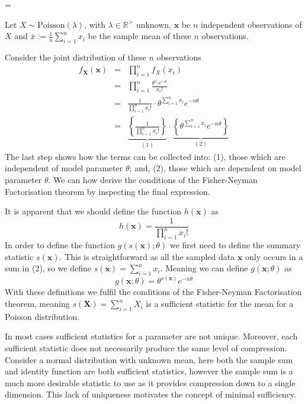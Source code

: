 \documentclass[11pt,a4paper]{article}
\theoremstyle{break}
\begin{document}
  \begin{box_example}\label{example_sufficient_stats_poisson}
    \everymath={\displaystyle}
    \par\par Let $X\sim\text{Poisson}(\lambda)$, with $\lambda\in\mathbb{R}^{>}$ unknown, $\mathbf{x}$ be $n$ independent observations of $X$ and $\textstyle\bar{x}:=\frac1n\sum_{i=1}^nx_i$ be the sample mean of these $n$ observations.
    \par Consider the joint distribution of these $n$ observations
    \[\begin{array}{rcl}
      f_{\mathbf{X}}(\mathbf{x})&=&\prod_{i=1}^nf_X(x_i)\\
      &=&\prod_{i=1}^n\frac{\theta^{x_i}e^{-\theta}}{x_i!}\\
      &=&\frac{1}{\prod_{i=1}^nx_i!}\cdot\theta^{\sum_{i=1}^nx_i}e^{-n\theta}\\
      &=&\underbrace{\left\{\frac{1}{\prod_{i=1}^nx_i!}\right\}}_{(1)}\cdot\underbrace{\left\{\theta^{\sum_{i=1}^nx_i}e^{-n\theta}\right\}}_{(2)}
    \end{array}\]
    The last step shows how the terms can be collected into: (1), those which are independent of model parameter $\theta$; and, (2), those which are dependent on model parameter $\theta$. We can how derive the conditions of the Fisher-Neyman Factorisation theorem by inspecting the final expression.
    \par It is apparent that we should define the function $h(\mathbf{x})$ as
    \[ h(\mathbf{x})=\frac1{\prod_{i=1}^nx_i!} \]
    In order to define the function $g(s(\mathbf{x});\theta)$ we first need to define the summary statistic $s(\mathbf{x})$. This is straightforward as all the sampled data $\mathbf{x}$ only occurs in a sum in (2), so we define $\textstyle s(\mathbf{x})=\sum_{i=1}^n x_i$. Meaning we can define $g(\mathbf{x};\theta)$ as
    \[ g(\mathbf{x};\theta)=\theta^{s(\mathbf{x})}e^{-n\theta} \]
    With these definitions we fulfil the conditions of the Fisher-Neyman Factorisation theorem, meaning $s(\mathbf{X})=\sum_{i=1}^nX_i$ is a sufficient statistic for the mean for a Poisson distribution.
  \end{box_example}

  \par In most cases sufficient statistics for a parameter are not unique. Moreover, each sufficient statistic does not necessarily produce the same level of compression. Consider a normal distribution with unknown mean, here both the sample sum and identity function are both sufficient statistics, however the sample sum is a much more desirable statistic to use as it provides compression down to a single dimension. This lack of uniqueness motivates the concept of minimal sufficiency.
\end{document}
